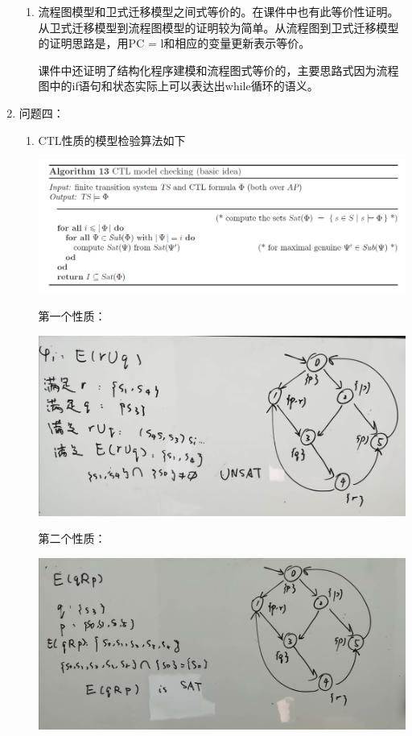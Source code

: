 \documentclass[UTF-8]{ctexart}
\begin{document}
\begin{enumerate}
\begin{enumerate}
\item 流程图模型和卫式迁移模型之间式等价的。在课件中也有此等价性证明。从卫式迁移模型到流程图模型的证明较为简单。从流程图到卫式迁移模型的证明思路是，用PC = l和相应的变量更新表示等价。

课件中还证明了结构化程序建模和流程图式等价的，主要思路式因为流程图中的if语句和状态实际上可以表达出while循环的语义。

\end{enumerate}



\item 问题四：

\begin{enumerate}
\item CTL性质的模型检验算法如下
\begin{center}
\includegraphics[scale=0.4]{2.PNG}

\end{center}
第一个性质：


\includegraphics[scale= 0.12]{6.jpg}

第二个性质：


\includegraphics[scale=0.12]{7.jpg}


\end{enumerate}
\end{enumerate}
\end{document}

